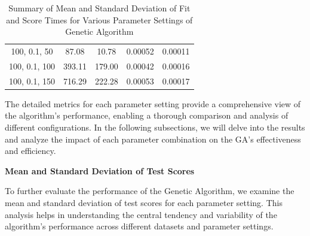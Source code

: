 \documentclass{article}
\begin{document}
\begin{table}[H]
{\begin{tabular}{|c|c|c|c|c|}
                100, 0.1, 50               & 87.08                  & 10.78                 & 0.00052                  & 0.00011                 \\
                100, 0.1, 100              & 393.11                 & 179.00                & 0.00042                  & 0.00016                 \\
                100, 0.1, 150              & 716.29                 & 222.28                & 0.00053                  & 0.00017                 \\
                \hline
            \end{tabular}
        }
        \caption{Summary of Mean and Standard Deviation of Fit and Score Times for Various Parameter Settings of Genetic Algorithm}
        \label{tab:ga_summary_fit_score_times}
    \end{table}

    The detailed metrics for each parameter setting provide a comprehensive view of the algorithm's performance, enabling a thorough comparison and analysis of different configurations. In the following subsections, we will delve into the results and analyze the impact of each parameter combination on the GA's effectiveness and efficiency.

    \textbf{Mean and Standard Deviation of Test Scores}

    To further evaluate the performance of the Genetic Algorithm, we examine the mean and standard deviation of test scores for each parameter setting. This analysis helps in understanding the central tendency and variability of the algorithm's performance across different datasets and parameter settings.
\end{document}

